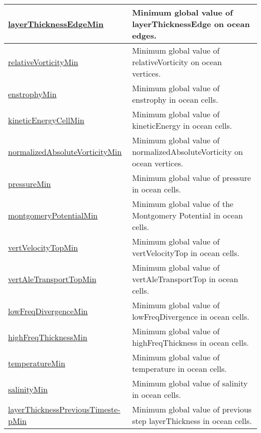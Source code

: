 {\begin{center}
\begin{longtable}{| p{2.0in} | p{4.0in} |}
    \hline
    \hyperref[subsec:var_sec_globalStatsAM_layerThicknessEdgeMin]{layerThicknessEdgeMin} & Minimum global value of layerThicknessEdge on ocean edges. \\
    \hline
    \hyperref[subsec:var_sec_globalStatsAM_relativeVorticityMin]{relativeVorticityMin} & Minimum global value of relativeVorticity on ocean vertices. \\
    \hline
    \hyperref[subsec:var_sec_globalStatsAM_enstrophyMin]{enstrophyMin} & Minimum global value of enstrophy in ocean cells. \\
    \hline
    \hyperref[subsec:var_sec_globalStatsAM_kineticEnergyCellMin]{kineticEnergyCellMin} & Minimum global value of kineticEnergy in ocean cells. \\
    \hline
    \hyperref[subsec:var_sec_globalStatsAM_normalizedAbsoluteVorticityMin]{normalizedAbsoluteVorticityMin} & Minimum global value of normalizedAbsoluteVorticity on ocean vertices. \\
    \hline
    \hyperref[subsec:var_sec_globalStatsAM_pressureMin]{pressureMin} & Minimum global value of pressure in ocean cells. \\
    \hline
    \hyperref[subsec:var_sec_globalStatsAM_montgomeryPotentialMin]{montgomeryPotentialMin} & Minimum global value of the Montgomery Potential in ocean cells. \\
    \hline
    \hyperref[subsec:var_sec_globalStatsAM_vertVelocityTopMin]{vertVelocityTopMin} & Minimum global value of vertVelocityTop in ocean cells. \\
    \hline
    \hyperref[subsec:var_sec_globalStatsAM_vertAleTransportTopMin]{vertAleTransportTopMin} & Minimum global value of vertAleTransportTop in ocean cells. \\
    \hline
    \hyperref[subsec:var_sec_globalStatsAM_lowFreqDivergenceMin]{lowFreqDivergenceMin} & Minimum global value of lowFreqDivergence in ocean cells. \\
    \hline
    \hyperref[subsec:var_sec_globalStatsAM_highFreqThicknessMin]{highFreqThicknessMin} & Minimum global value of highFreqThickness in ocean cells. \\
    \hline
    \hyperref[subsec:var_sec_globalStatsAM_temperatureMin]{temperatureMin} & Minimum global value of temperature in ocean cells. \\
    \hline
    \hyperref[subsec:var_sec_globalStatsAM_salinityMin]{salinityMin} & Minimum global value of salinity in ocean cells. \\
    \hline
    \hyperref[subsec:var_sec_globalStatsAM_layerThicknessPreviousTimestepMin]{layerThicknessPreviousTimeste-}\hyperref[subsec:var_sec_globalStatsAM_layerThicknessPreviousTimestepMin]{pMin}  & Minimum global value of previous step layerThickness in ocean cells. \\

\end{longtable}
\end{center}}
